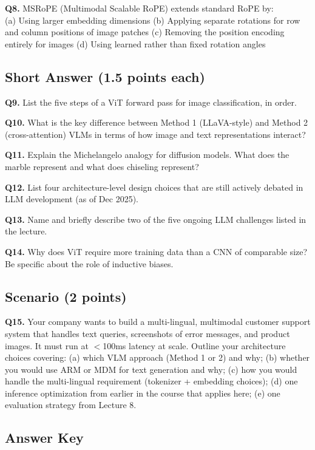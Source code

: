 \documentclass[11pt, a4paper]{article}
\begin{document}
\textbf{Q8.} MSRoPE (Multimodal Scalable RoPE) extends standard RoPE by:\\
(a) Using larger embedding dimensions\quad
(b) Applying separate rotations for row and column positions of image patches\quad
(c) Removing the position encoding entirely for images\quad
(d) Using learned rather than fixed rotation angles

\subsection*{Short Answer (1.5 points each)}

\textbf{Q9.} List the five steps of a ViT forward pass for image classification, in order.

\textbf{Q10.} What is the key difference between Method 1 (LLaVA-style) and Method 2 (cross-attention) VLMs in terms of how image and text representations interact?

\textbf{Q11.} Explain the Michelangelo analogy for diffusion models. What does the marble represent and what does chiseling represent?

\textbf{Q12.} List four architecture-level design choices that are still actively debated in LLM development (as of Dec 2025).

\textbf{Q13.} Name and briefly describe two of the five ongoing LLM challenges listed in the lecture.

\textbf{Q14.} Why does ViT require more training data than a CNN of comparable size? Be specific about the role of inductive biases.

\subsection*{Scenario (2 points)}

\textbf{Q15.} Your company wants to build a multi-lingual, multimodal customer support system that handles text queries, screenshots of error messages, and product images. It must run at $<$100ms latency at scale. Outline your architecture choices covering: (a) which VLM approach (Method 1 or 2) and why; (b) whether you would use ARM or MDM for text generation and why; (c) how you would handle the multi-lingual requirement (tokenizer + embedding choices); (d) one inference optimization from earlier in the course that applies here; (e) one evaluation strategy from Lecture 8.

\newpage
\subsection*{Answer Key}
\end{document}

